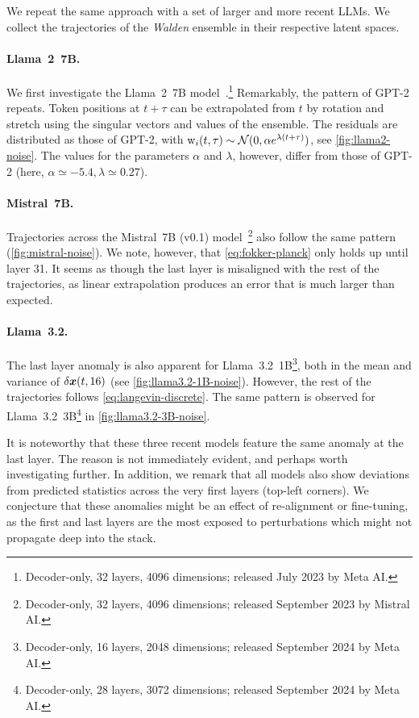 \documentclass{article} %
\begin{document}
We repeat the same approach with a set of larger and more recent LLMs.
We collect the trajectories of the \textit{Walden} ensemble in their respective latent spaces.

\paragraph{Llama~2~7B.}
We first investigate the Llama~2~7B model~\citep{touvron2023llama2openfoundation}.\footnote{
Decoder-only, 32 layers, 4096 dimensions; released July 2023 by Meta AI.
} 
Remarkably, the pattern of GPT-2 repeats.
Token positions at $t+\tau$ can be extrapolated from $t$ by rotation and stretch using the singular vectors and values of the ensemble.
The residuals are distributed as those of GPT-2, with ${\textnormal{w}}_i(t,\tau) \sim \mathcal{N}(0,\alpha e^{\lambda (t+\tau)})$, see \cref{fig:llama2-noise}. 
The values for the parameters $\alpha$ and $\lambda$, however, differ from those of GPT-2 (here, $\alpha \simeq -5.4, \lambda \simeq 0.27$).

\paragraph{Mistral~7B.}
Trajectories across the  Mistral~7B (v0.1) model~\citep{jiang2023mistral7b}\footnote{
Decoder-only, 32 layers, 4096 dimensions; released September 2023 by Mistral AI.
}
also follow the same pattern (\cref{fig:mistral-noise}).
We note, however, that \cref{eq:fokker-planck} only holds up until layer 31. 
It seems as though the last layer is misaligned with the rest of the trajectories, as linear extrapolation produces an error that is much larger than expected.

\paragraph{Llama~3.2.}
The last layer anomaly is also apparent for Llama~3.2~1B\footnote{
Decoder-only, 16 layers, 2048 dimensions; released September 2024 by Meta AI.
}, both in the mean and variance of $\delta{\bm{x}}(t,16)$ (see \cref{fig:llama3.2-1B-noise}).
However, the rest of the trajectories follows \cref{eq:langevin-discrete}.
The same pattern is observed for Llama~3.2~3B\footnote{
Decoder-only, 28 layers, 3072 dimensions; released September 2024 by Meta AI.
} in \cref{fig:llama3.2-3B-noise}.

It is noteworthy that these three recent models feature the same anomaly at the last layer.
The reason is not immediately evident, and perhaps worth investigating further.
In addition, we remark that all models also show deviations from predicted statistics across the very first layers (top-left corners). 
We conjecture that these anomalies might be an effect of re-alignment or fine-tuning, as the first and last layers are the most exposed to perturbations which might not propagate deep into the stack.
\end{document}
